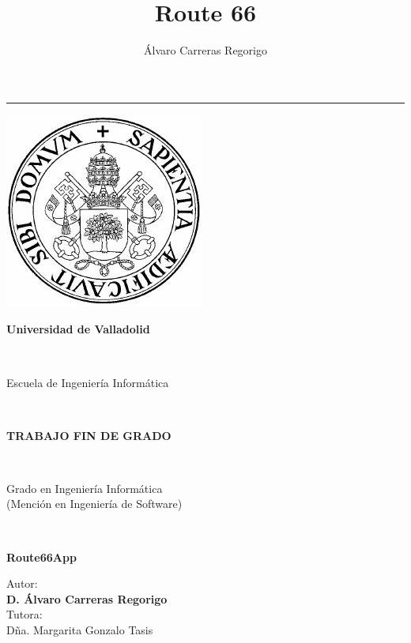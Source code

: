 \documentclass[twoside]{report}
\author{Álvaro Carreras Regorigo}
\title{Route 66}
\begin{document}
\rule{\oddsidemargin}{2cm}
\begin{titlepage}
\begin{center}
\includegraphics[scale=0.5]{images/logoUVa}\\\vspace{1cm}
\begin{LARGE}\textbf{Universidad de Valladolid}\end{LARGE}\\
\vspace{2cm}
\begin{Huge}Escuela de Ingeniería Informática\end{Huge} \\\vspace{0.5cm}
\begin{large}\textbf{TRABAJO FIN DE GRADO}\end{large}\\ \vspace{2.5cm}
\begin{Large}Grado en Ingeniería Informática \\ (Mención en Ingeniería de Software)\end{Large}\\ \vspace{4cm}
\begin{Huge}\textbf{Route66App}\end{Huge}
\end{center}\vspace{6cm}
\begin{flushright}
\begin{large}Autor: \\\textbf{D. Álvaro Carreras Regorigo}\\
Tutora:\\
Dña. Margarita Gonzalo Tasis\end{large}
\end{flushright}
\end{titlepage}
\clearpage
\end{document}
